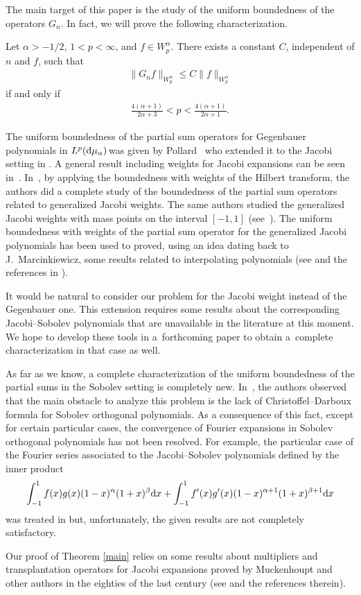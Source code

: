 The main target of this paper is the study of the uniform boundedness of the operators $G_n$. In fact, we will prove the following characterization.
\begin{thm}\label{main}
	Let $\alpha>-1/2$, $1<p<\infty$, and $f\in W_p^{\alpha}$. There exists a constant $C$, independent of $n$ and $f$, such that
	\begin{gather*}%
	\|G_nf\|_{W_p^{\alpha}}\le C\|f\|_{W_p^{\alpha}}
	\end{gather*}
	if and only if
	\begin{gather}\label{acotacionp}
	\frac{4(\alpha+1)}{2\alpha+3}<p<\frac{4(\alpha+1)}{2\alpha+1}.
	\end{gather}
\end{thm}

The uniform boundedness of the partial sum operators for Gegenbauer polynomials in $L^p({\rm d}\mu_{\alpha})\!$ was given by Pollard~\cite{PollardII} who extended it to the Jacobi setting in \cite{PollardIII}. A general result including weights for Jacobi expansions can be seen in~\cite{muckenhoupt}. In~\cite{GPRV1}, by applying the boundedness with weights of the Hilbert transform, the authors did a complete study of the boundedness of the partial sum operators related to generalized Jacobi weights. The same authors studied the generalized Jacobi weights with mass points on the interval $[-1,1]$ (see~\cite{GPRV2}). The uniform boundedness with weights of the partial sum operator for the generalized Jacobi polynomials has been used to proved, using an idea dating back to J.~Marcinkiewicz, some results related to interpolating polynomials (see \cite{Xu-93,Xu-94} and the references in \cite{Nevai}).

It would be natural to consider our problem for the Jacobi weight instead of the Gegenbauer one. This extension requires some results about the corresponding Jacobi--Sobolev polyno\-mials that are unavailable in the literature at this moment. We hope to develop these tools in a~forthcoming paper to obtain a~complete characterization in that case as well.

As far as we know, a complete characterization of the uniform boundedness of the partial sums in the Sobolev setting is completely new. In~\cite{Marce-Xu}, the authors observed that the main obstacle to analyze this problem is the lack of Christoffel--Darboux formula for Sobolev orthogonal polynomials. As a consequence of this fact, except for certain particular cases, the convergence of Fourier expansions in Sobolev orthogonal polynomials has not been resolved. For example, the particular case of the Fourier series associated to the Jacobi--Sobolev polynomials defined by the inner product
\begin{gather*}
\int_{-1}^{1} f(x)g(x)(1-x)^\alpha(1+x)^\beta {\rm d}x+ \int_{-1}^{1} f'(x)g'(x)(1-x)^{\alpha+1}(1+x)^{\beta+1} {\rm d}x
\end{gather*}
was treated in \cite{MQU} but, unfortunately, the given results are not completely satisfactory.


Our proof of Theorem \ref{main} relies on some results about multipliers and transplantation ope\-ra\-tors for Jacobi expansions proved by Muckenhoupt and other authors in the eighties of the last century (see \cite{muckenhoupt1} and the references therein).

